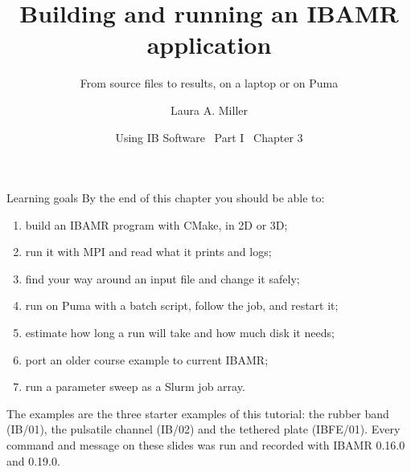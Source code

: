 \documentclass[aspectratio=169,11pt]{beamer}
\title[Building and running]{Building and running an IBAMR application}
\subtitle{From source files to results, on a laptop or on Puma}
\author[Miller]{Laura A. Miller}
\institute[UArizona]{Department of Mathematics, University of Arizona}
\date{Using IB Software \textbullet\ Part I \textbullet\ Chapter 3}
\begin{document}
\begin{frame}[plain]
\end{frame}

\begin{frame}{Learning goals}
By the end of this chapter you should be able to:
\begin{enumerate}
  \item build an IBAMR program with CMake, in 2D or 3D;
  \item run it with MPI and read what it prints and logs;
  \item find your way around an input file and change it safely;
  \item run on Puma with a batch script, follow the job, and restart it;
  \item estimate how long a run will take and how much disk it needs;
  \item port an older course example to current IBAMR;
  \item run a parameter sweep as a Slurm job array.
\end{enumerate}
\vspace{3mm}
\begin{punchbox}
\small The examples are the three starter examples of this tutorial: the rubber band (IB/01), the pulsatile channel (IB/02) and the tethered plate (IBFE/01). Every command and message on these slides was run and recorded with IBAMR 0.16.0 and 0.19.0.
\end{punchbox}
\end{frame}
\end{document}
